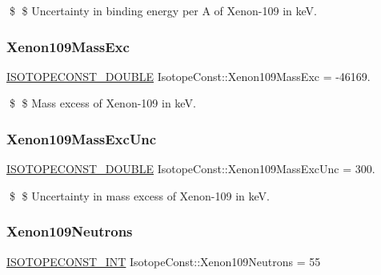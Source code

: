 \$ \$ Uncertainty in binding energy per A of Xenon-\/109 in keV. \mbox{\label{group___isotope_const-_xenon-_xe109_ga81a92bfbe5dd2c35fd24ab27782f489b}} 
\subsubsection{\texorpdfstring{Xenon109\+Mass\+Exc}{Xenon109MassExc}}
{\footnotesize\ttfamily \mbox{\hyperlink{group___isotope_const-_macros_ga8f45a7272ce02c0b4c65c44636ed719a}{I\+S\+O\+T\+O\+P\+E\+C\+O\+N\+S\+T\+\_\+\+D\+O\+U\+B\+LE}} Isotope\+Const\+::\+Xenon109\+Mass\+Exc = -\/46169.}

\$ \$ Mass excess of Xenon-\/109 in keV. \mbox{\label{group___isotope_const-_xenon-_xe109_gaf808f4a65ac4ec927363fafc56bc03fa}} 
\subsubsection{\texorpdfstring{Xenon109\+Mass\+Exc\+Unc}{Xenon109MassExcUnc}}
{\footnotesize\ttfamily \mbox{\hyperlink{group___isotope_const-_macros_ga8f45a7272ce02c0b4c65c44636ed719a}{I\+S\+O\+T\+O\+P\+E\+C\+O\+N\+S\+T\+\_\+\+D\+O\+U\+B\+LE}} Isotope\+Const\+::\+Xenon109\+Mass\+Exc\+Unc = 300.}

\$ \$ Uncertainty in mass excess of Xenon-\/109 in keV. \mbox{\label{group___isotope_const-_xenon-_xe109_ga9c5a916f8a3e62faaac3f72147ff0b99}} 
\subsubsection{\texorpdfstring{Xenon109\+Neutrons}{Xenon109Neutrons}}
{\footnotesize\ttfamily \mbox{\hyperlink{group___isotope_const-_macros_ga5f18360b3e99483a35c32d789e62621c}{I\+S\+O\+T\+O\+P\+E\+C\+O\+N\+S\+T\+\_\+\+I\+NT}} Isotope\+Const\+::\+Xenon109\+Neutrons = 55}

